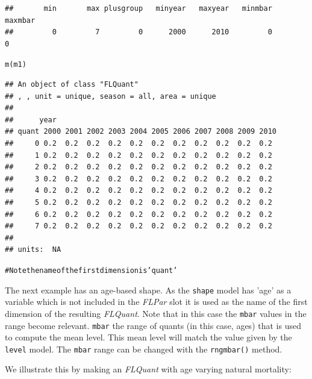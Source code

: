 \documentclass[a4paper,english,10pt]{article}\usepackage[]{graphicx}\usepackage[]{color}
\makeatletter
\newcommand{\hlcom}[1]{\textcolor[rgb]{0.2,0.267,0.4}{#1}}%
\newcommand{\hlstd}[1]{\textcolor[rgb]{0,0,0}{#1}}%
\newcommand{\hlkwd}[1]{\textcolor[rgb]{0.361,0.506,0.596}{#1}}%
\newenvironment{kframe}{%
 \def\at@end@of@kframe{}%
 \ifinner\ifhmode%
  \def\at@end@of@kframe{\end{minipage}}%
  \begin{minipage}{\columnwidth}%
 \fi\fi%
 \def\FrameCommand##1{\hskip\@totalleftmargin \hskip-\fboxsep
 \colorbox{shadecolor}{##1}\hskip-\fboxsep
     \hskip-\linewidth \hskip-\@totalleftmargin \hskip\columnwidth}%
 \MakeFramed {\advance\hsize-\width
   \@totalleftmargin\z@ \linewidth\hsize
   \@setminipage}}%
 {\par\unskip\endMakeFramed%
 \at@end@of@kframe}
\newenvironment{knitrout}{}{} %
\newcommand{\code}[1]{{\texttt{#1}}}
\newcommand{\class}[1]{{\textit{#1}}}
\makeatother
\begin{document}
\begin{knitrout}
\begin{kframe}
\begin{alltt}
\end{alltt}
\begin{verbatim}
##       min       max plusgroup   minyear   maxyear   minmbar   maxmbar 
##         0         7         0      2000      2010         0         0
\end{verbatim}
\begin{alltt}
\hlkwd{m}\hlstd{(m1)}
\end{alltt}
\begin{verbatim}
## An object of class "FLQuant"
## , , unit = unique, season = all, area = unique
## 
##      year
## quant 2000 2001 2002 2003 2004 2005 2006 2007 2008 2009 2010
##     0 0.2  0.2  0.2  0.2  0.2  0.2  0.2  0.2  0.2  0.2  0.2 
##     1 0.2  0.2  0.2  0.2  0.2  0.2  0.2  0.2  0.2  0.2  0.2 
##     2 0.2  0.2  0.2  0.2  0.2  0.2  0.2  0.2  0.2  0.2  0.2 
##     3 0.2  0.2  0.2  0.2  0.2  0.2  0.2  0.2  0.2  0.2  0.2 
##     4 0.2  0.2  0.2  0.2  0.2  0.2  0.2  0.2  0.2  0.2  0.2 
##     5 0.2  0.2  0.2  0.2  0.2  0.2  0.2  0.2  0.2  0.2  0.2 
##     6 0.2  0.2  0.2  0.2  0.2  0.2  0.2  0.2  0.2  0.2  0.2 
##     7 0.2  0.2  0.2  0.2  0.2  0.2  0.2  0.2  0.2  0.2  0.2 
## 
## units:  NA
\end{verbatim}
\begin{alltt}
\hlcom{# Note the name of the first dimension is 'quant'}
\end{alltt}
\end{kframe}
\end{knitrout}

The next example has an age-based shape. As the \code{shape} model has 'age' as a variable which is not included in the \class{FLPar} slot it is used as the name of the first dimension of the resulting \class{FLQuant}. Note that in this case the \code{mbar} values in the range become relevant. \code{mbar} the range of quants (in this case, ages) that is used to compute the mean level. This mean level will match the value given by the \code{level} model. The \code{mbar} range can be changed with the \code{rngmbar()} method.

We illustrate this by making an \class{FLQuant} with age varying natural mortality:
\end{document}
